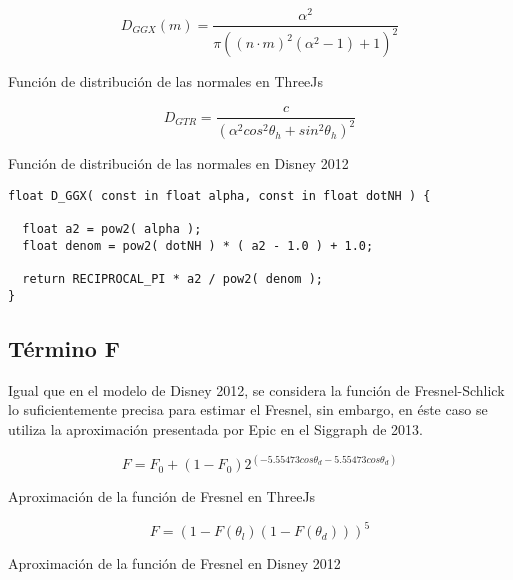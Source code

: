   \begin{eqfloat}
    \begin{equation}
      D_{GGX}(m) = \frac{\alpha^2}{\pi((n\cdotp{m})^2(\alpha^2 - 1 ) + 1)^2}
    \end{equation}
  \caption{Funci\'on de distribuci\'on de las normales en ThreeJs}
  \end{eqfloat}
  \singlespacing

  \begin{eqfloat}
    \begin{equation}
      D_{GTR} = \frac
      {c}
      {(\alpha^2 cos^2 \theta_h + sin^2 \theta_h)^2}
    \end{equation}
  \caption{Funci\'on de distribuci\'on de las normales en Disney 2012}
  \end{eqfloat}
  \singlespacing

  \begin{lstlisting}[caption=Implementaci\'on en ThreeJs del t\'ermino de geometr\'ia]
float D_GGX( const in float alpha, const in float dotNH ) {

  float a2 = pow2( alpha );
  float denom = pow2( dotNH ) * ( a2 - 1.0 ) + 1.0;

  return RECIPROCAL_PI * a2 / pow2( denom );
}
  \end{lstlisting}
  \singlespacing

  \subsection*{T\'ermino F}
  Igual que en el modelo de Disney 2012, se considera la funci\'on de Fresnel-Schlick lo suficientemente precisa para
  estimar el Fresnel, sin embargo, en \'este caso se utiliza la aproximaci\'on presentada por Epic en el Siggraph de 2013.\\

  \begin{eqfloat}
    \begin{equation}
      F= F_0 + (1 - F_0)2^{(-5.55473cos\theta_d - 5.55473cos\theta_d)}
    \end{equation}
  \caption{Aproximaci\'on de la funci\'on de Fresnel en ThreeJs}
  \end{eqfloat}

  \begin{eqfloat}[!htb]
    \begin{equation}
      F= (1 - F(\theta_l) (1 - F(\theta_d)))^5
    \end{equation}
  \caption{Aproximaci\'on de la funci\'on de Fresnel en Disney 2012}
  \end{eqfloat}

